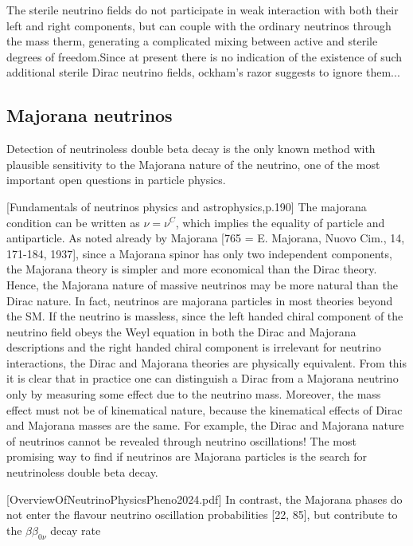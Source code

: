 The sterile neutrino fields do not participate in weak interaction with both their left and right components, but can couple with the ordinary neutrinos through the mass therm, generating a complicated mixing between active and sterile degrees of freedom.Since at present there is no indication of the existence of such additional sterile Dirac neutrino fields, ockham's razor suggests to ignore them...


\subsection{Majorana neutrinos}
Detection of neutrinoless double beta decay is the only known method with plausible sensitivity to the Majorana nature of the neutrino, one of the most important open questions in particle physics. \cite{SnowmassNeutrinoFrontierReport.pdf}

[Fundamentals of neutrinos physics and astrophysics,p.190]
The majorana condition can be written as $\nu=\nu^C$, which implies the equality of particle and antiparticle. As noted already by Majorana [765 = E. Majorana, Nuovo Cim., 14, 171-184, 1937], since a Majorana spinor has only two independent components, the Majorana theory is simpler and more economical than the Dirac theory. Hence, the Majorana nature of massive neutrinos may be more natural than the Dirac nature. In fact, neutrinos are majorana particles in most theories beyond the SM.
If the neutrino is massless, since the left handed chiral component of the neutrino field obeys the Weyl equation in both the Dirac and Majorana descriptions and the right handed chiral component is irrelevant for neutrino interactions, the Dirac and Majorana theories are physically equivalent. From this it is clear that in practice one can distinguish a Dirac from a Majorana neutrino only by measuring some effect due to the neutrino mass. Moreover, the mass effect must not be of kinematical nature, because the kinematical effects of Dirac and Majorana masses are the same. For example, the Dirac and Majorana nature of neutrinos cannot be revealed through neutrino oscillations! The most promising way to find if neutrinos are Majorana particles is the search for neutrinoless double beta decay.

[OverviewOfNeutrinoPhysicsPheno2024.pdf] In contrast, the Majorana phases do not enter the flavour neutrino oscillation probabilities [22, 85], but contribute to the $\beta\beta_{0\nu}$ decay rate